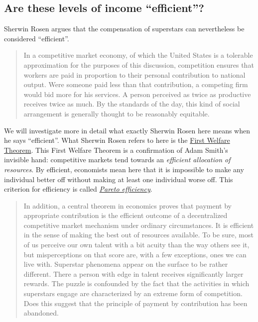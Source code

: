 \documentclass[]{book}
\theoremstyle{definition}
\theoremstyle{definition}
\theoremstyle{definition}
\theoremstyle{remark}
\begin{document}
\subsection{\texorpdfstring{Are these levels of income
``efficient''?}{Are these levels of income efficient?}}\label{are-these-levels-of-income-efficient}

Sherwin Rosen argues that the compensation of superstars can
nevertheless be considered ``efficient''.

\begin{quote}
In a competitive market economy, of which the United States is a
tolerable approximation for the purposes of this discussion, competition
ensures that workers are paid in proportion to their personal
contribution to national output. Were someone paid less than that
contribution, a competing firm would bid more for his services. A person
perceived as twice as productive receives twice as much. By the
standards of the day, this kind of social arrangement is generally
thought to be reasonably equitable.
\end{quote}

We will investigate more in detail what exactly Sherwin Rosen here means
when he says ``efficient''. What Sherwin Rosen refers to here is the
\href{https://en.wikipedia.org/wiki/Fundamental_theorems_of_welfare_economics}{First
Welfare Theorem}. This First Welfare Theorem is a confirmation of Adam
Smith's invisible hand: competitive markets tend towards an
\emph{efficient allocation of resources}. By efficient, economists mean
here that it is impossible to make any individual better off without
making at least one individual worse off. This criterion for efficiency
is called
\href{https://en.wikipedia.org/wiki/Pareto_efficiency}{\emph{Pareto
efficiency}}.

\begin{quote}
In addition, a central theorem in economics proves that payment by
appropriate contribution is the efficient outcome of a decentralized
competitive market mechanism under ordinary circumstances. It is
efficient in the sense of making the best out of resources available. To
be sure, most of us perceive our own talent with a bit acuity than the
way others see it, but misperceptions on that score are, with a few
exceptions, ones we can live with. Superstar phenomena appear on the
surface to be rather different. There a person with edge in talent
receives significantly larger rewards. The puzzle is confounded by the
fact that the activities in which superstars engage are characterized by
an extreme form of competition. Does this suggest that the principle of
payment by contribution has been abandoned.
\end{quote}
\end{document}

